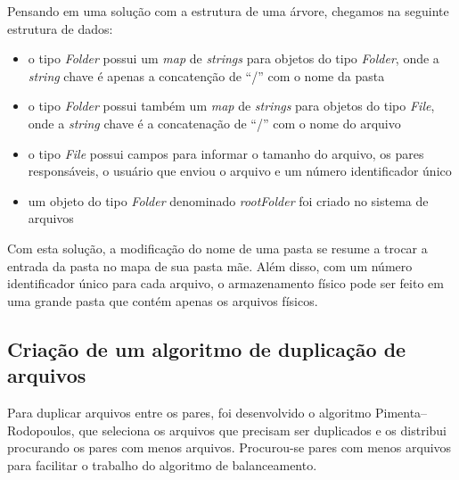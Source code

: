 \documentclass{article}
\begin{document}
Pensando em uma solução com a estrutura de uma árvore, chegamos na seguinte estrutura de dados:
\begin{itemize}
	\item o tipo \textit{Folder} possui um \textit{map} de \textit{strings} para objetos do tipo \textit{Folder}, onde a \textit{string} chave é apenas a concatenção de ``/'' com o nome da pasta
	\item o tipo \textit{Folder} possui também um \textit{map} de \textit{strings} para objetos do tipo \textit{File}, onde a \textit{string} chave é a concatenação de ``/'' com o nome do arquivo
	\item o tipo \textit{File} possui campos para informar o tamanho do arquivo, os pares responsáveis, o usuário que enviou o arquivo e um número identificador único
	\item um objeto do tipo \textit{Folder} denominado \textit{rootFolder} foi criado no sistema de arquivos
\end{itemize}

Com esta solução, a modificação do nome de uma pasta se resume a trocar a entrada da pasta no mapa de sua pasta mãe. Além disso, com um número identificador único para cada arquivo, o armazenamento físico pode ser feito em uma grande pasta que contém apenas os arquivos físicos.

\subsection{Criação de um algoritmo de duplicação de arquivos}

\indent

Para duplicar arquivos entre os pares, foi desenvolvido o algoritmo Pimenta--Rodopoulos, que seleciona os arquivos que precisam ser duplicados e os distribui procurando os pares com menos arquivos. Procurou-se pares com menos arquivos para facilitar o trabalho do algoritmo de balanceamento.
\end{document}

